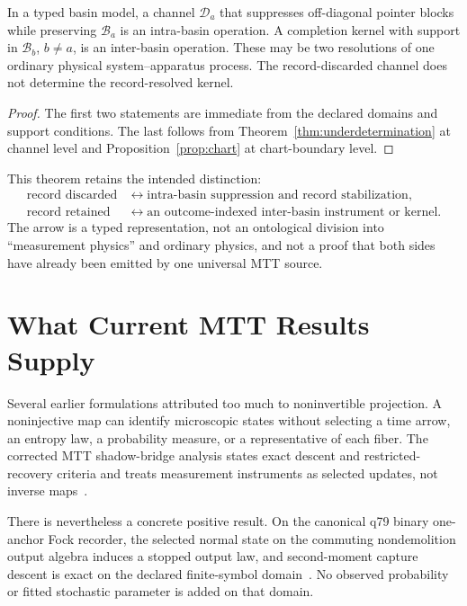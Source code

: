 \documentclass[11pt]{article}
\newcommand{\Bas}{\mathcal B}
\newcommand{\Chan}{\mathcal D}
\begin{document}
\begin{theorem}
\label{thm:bridge}
In a typed basin model, a channel $\Chan_a$ that suppresses off-diagonal
pointer blocks while preserving $\Bas_a$ is an intra-basin operation.  A
completion kernel with support in $\Bas_b$, $b\neq a$, is an inter-basin
operation.  These may be two resolutions of one ordinary physical
system--apparatus process.  The record-discarded channel does not determine the
record-resolved kernel.
\end{theorem}

\begin{proof}
The first two statements are immediate from the declared domains and support
conditions.  The last follows from
Theorem~\ref{thm:underdetermination} at channel level and
Proposition~\ref{prop:chart} at chart-boundary level.
\end{proof}

This theorem retains the intended distinction:
\[
\boxed{
\begin{aligned}
\text{record discarded} &\longleftrightarrow
  \text{intra-basin suppression and record stabilization},\\
\text{record retained} &\longleftrightarrow
  \text{an outcome-indexed inter-basin instrument or kernel}.
\end{aligned}}
\]
The arrow is a typed representation, not an ontological division into
``measurement physics'' and ordinary physics, and not a proof that both sides
have already been emitted by one universal MTT source.

\section{What Current MTT Results Supply}

Several earlier formulations attributed too much to noninvertible projection.
A noninjective map can identify microscopic states without selecting a time
arrow, an entropy law, a probability measure, or a representative of each
fiber.  The corrected MTT shadow-bridge analysis states exact descent and
restricted-recovery criteria and treats measurement instruments as selected
updates, not inverse maps~\cite{NeroProjectionProbability}.

There is nevertheless a concrete positive result.  On the canonical q79
binary one-anchor Fock recorder, the selected normal state on the commuting
nondemolition output algebra induces a stopped output law, and
second-moment capture descent is exact on the declared finite-symbol
domain~\cite{NeroQ79Recorder}.  No observed probability or fitted stochastic
parameter is added on that domain.
\end{document}
